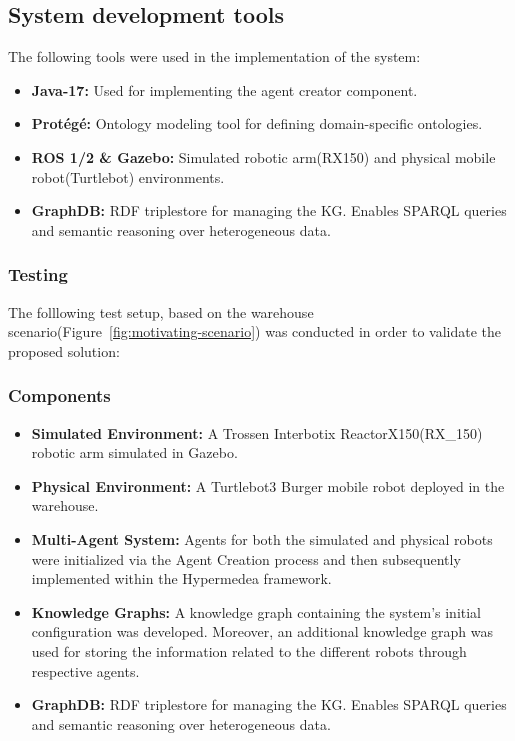 \documentclass{article} %
\begin{document}
\subsection{System development tools}
The following tools were used in the implementation of the system:

\begin{itemize}
\item \textbf{Java-17:} Used for implementing the agent creator component.
   
\item \textbf{Protégé:} Ontology modeling tool for defining domain-specific ontologies.
  
\item \textbf{ROS 1/2 \& Gazebo:}  Simulated robotic arm(RX150) and physical mobile robot(Turtlebot) environments.
   
\item \textbf{GraphDB:} RDF triplestore for managing the KG. Enables SPARQL queries and semantic reasoning over heterogeneous data.

\end{itemize}

\subsubsection{Testing}
The folllowing test setup, based on the warehouse scenario(Figure~\ref{fig:motivating-scenario}) was conducted in order to validate the proposed solution:

\subsubsection{Components}

\begin{itemize}
\item \textbf{Simulated Environment:} A Trossen Interbotix ReactorX150(RX\_150) robotic arm simulated in Gazebo.

\item \textbf{Physical Environment:} A Turtlebot3 Burger mobile robot deployed in the warehouse. 
    
\item \textbf{Multi-Agent System:} Agents for both the simulated and physical robots were initialized via the Agent Creation process and then subsequently implemented within the Hypermedea framework.
  
\item \textbf{Knowledge Graphs:} A knowledge graph containing the system's initial configuration was developed. Moreover, an additional knowledge graph was used for storing the information related to the different robots through respective agents.
   
\item \textbf{GraphDB:} RDF triplestore for managing the KG. Enables SPARQL queries and semantic reasoning over heterogeneous data.

\end{itemize}
\end{document}
